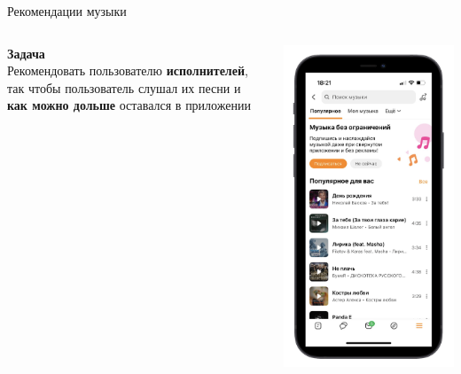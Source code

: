 \documentclass[11pt,aspectratio=169,handout]{beamer}
\begin{document}
\begin{frame}{Рекомендации музыки}

\begin{columns}
\begin{column}{0.55\textwidth}
   {\bf Задача} \\
   Рекомендовать пользователю {\bf исполнителей}, так чтобы пользователь слушал их песни и {\bf как можно дольше} оставался в приложении
\end{column}
\begin{column}{0.3\textwidth}
    \includegraphics[scale=0.25]{images/music-screen.png}
\end{column}
\end{columns}

\end{frame}
\end{document}
